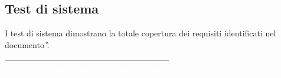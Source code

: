 \subsection{Test di sistema}
\raggedright{I test di sistema dimostrano la totale copertura dei requisiti identificati nel documento \AdR\G.} \\
{
    \setlength{\freewidth}{\dimexpr\textwidth-10\tabcolsep}
    \renewcommand{\arraystretch}{1.5}
    \centering
    \setlength{\aboverulesep}{0pt}
    \setlength{\belowrulesep}{0pt}
    \begin{longtable}{C{.3\freewidth} C{.5\freewidth} C{.3\freewidth}}
       \toprule
    \textcolor{white}{\textbf{Codice Test}}&
    \textcolor{white}{\textbf{Descrizione}}&
    \textcolor{white}{\textbf{Stato}}\\	
    \toprule
    \endhead


\end{longtable}}

